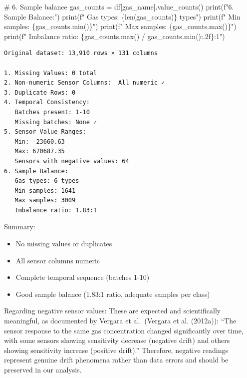 \documentclass[
  letterpaper,
  DIV=11,
  numbers=noendperiod]{scrartcl}
\newenvironment{Shaded}{\begin{snugshade}}{\end{snugshade}}
\newcommand{\BuiltInTok}[1]{\textcolor[rgb]{0.00,0.23,0.31}{#1}}
\newcommand{\CommentTok}[1]{\textcolor[rgb]{0.37,0.37,0.37}{#1}}
\newcommand{\NormalTok}[1]{\textcolor[rgb]{0.00,0.23,0.31}{#1}}
\newcommand{\OperatorTok}[1]{\textcolor[rgb]{0.37,0.37,0.37}{#1}}
\newcommand{\SpecialCharTok}[1]{\textcolor[rgb]{0.37,0.37,0.37}{#1}}
\newcommand{\SpecialStringTok}[1]{\textcolor[rgb]{0.13,0.47,0.30}{#1}}
\newcommand{\StringTok}[1]{\textcolor[rgb]{0.13,0.47,0.30}{#1}}
\providecommand{\tightlist}{%
  \setlength{\itemsep}{0pt}\setlength{\parskip}{0pt}}
\renewenvironment{Shaded}{%
  \begin{tcolorbox}[%
    enhanced,%
    colback=codebg,%
    colframe=codebg,%
    borderline west={3pt}{0pt}{sectionblue},%
    fontupper=\small\ttfamily,%
    boxrule=0pt,%
    arc=0pt,%
    boxsep=5pt,%
    left=2mm,%
    right=2mm,%
    top=2mm,%
    bottom=2mm%
  ]%
}{%
  \end{tcolorbox}%
}
\begin{document}
\begin{Shaded}
\begin{Highlighting}[]
\CommentTok{\# 6. Sample balance}
\NormalTok{gas\_counts }\OperatorTok{=}\NormalTok{ df[}\StringTok{\textquotesingle{}gas\_name\textquotesingle{}}\NormalTok{].value\_counts()}
\BuiltInTok{print}\NormalTok{(}\SpecialStringTok{f"6. Sample Balance:"}\NormalTok{)}
\BuiltInTok{print}\NormalTok{(}\SpecialStringTok{f"   Gas types: }\SpecialCharTok{\{}\BuiltInTok{len}\NormalTok{(gas\_counts)}\SpecialCharTok{\}}\SpecialStringTok{ types"}\NormalTok{)}
\BuiltInTok{print}\NormalTok{(}\SpecialStringTok{f"   Min samples: }\SpecialCharTok{\{}\NormalTok{gas\_counts}\SpecialCharTok{.}\BuiltInTok{min}\NormalTok{()}\SpecialCharTok{\}}\SpecialStringTok{"}\NormalTok{)}
\BuiltInTok{print}\NormalTok{(}\SpecialStringTok{f"   Max samples: }\SpecialCharTok{\{}\NormalTok{gas\_counts}\SpecialCharTok{.}\BuiltInTok{max}\NormalTok{()}\SpecialCharTok{\}}\SpecialStringTok{"}\NormalTok{)}
\BuiltInTok{print}\NormalTok{(}\SpecialStringTok{f"   Imbalance ratio: }\SpecialCharTok{\{}\NormalTok{gas\_counts}\SpecialCharTok{.}\BuiltInTok{max}\NormalTok{() }\OperatorTok{/}\NormalTok{ gas\_counts}\SpecialCharTok{.}\BuiltInTok{min}\NormalTok{()}\SpecialCharTok{:.2f\}}\SpecialStringTok{:1"}\NormalTok{)}
\end{Highlighting}
\end{Shaded}

\begin{verbatim}
Original dataset: 13,910 rows × 131 columns

1. Missing Values: 0 total
2. Non-numeric Sensor Columns:  All numeric ✓
3. Duplicate Rows: 0
4. Temporal Consistency:
   Batches present: 1-10
   Missing batches: None ✓
5. Sensor Value Ranges:
   Min: -23660.63
   Max: 670687.35
   Sensors with negative values: 64
6. Sample Balance:
   Gas types: 6 types
   Min samples: 1641
   Max samples: 3009
   Imbalance ratio: 1.83:1
\end{verbatim}

Summary:

\begin{itemize}
\tightlist
\item
  No missing values or duplicates
\item
  All sensor columns numeric
\item
  Complete temporal sequence (batches 1-10)
\item
  Good sample balance (1.83:1 ratio, adequate samples per class)
\end{itemize}

Regarding negative sensor values: These are expected and scientifically
meaningful, as documented by Vergara et al.~(Vergara et al. (2012a)):
``The sensor response to the same gas concentration changed
significantly over time, with some sensors showing sensitivity decrease
(negative drift) and others showing sensitivity increase (positive
drift).'' Therefore, negative readings represent genuine drift phenomena
rather than data errors and should be preserved in our analysis.
\end{document}
